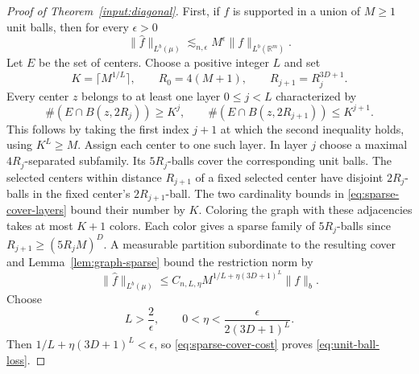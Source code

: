 \documentclass[11pt]{article}
\numberwithin{equation}{section}
\newcommand{\R}{\mathbb{R}}
\newcommand{\norm}[1]{\lVert #1\rVert}
\begin{document}
\begin{proof}[Proof of Theorem~\ref{input:diagonal}]
First, if \(f\) is supported in a union of \(M\ge1\) unit balls, then
for every \(\epsilon>0\)
\begin{equation}\label{eq:unit-ball-loss}
 \norm{\widehat f}_{L^b(\mu)}
 \lesssim_{n,\epsilon} M^\epsilon\norm f_{L^b(\R^m)}.
\end{equation}
Let \(E\) be the set of centers. Choose a positive integer \(L\) and set
\[
 K=\lceil M^{1/L}\rceil,\qquad
 R_0=4(M+1),\qquad R_{j+1}=R_j^{3D+1}.
\]
Every center \(z\) belongs to at least one layer \(0\le j<L\)
characterized by
\begin{equation}\label{eq:sparse-cover-layers}
 \#(E\cap B(z,2R_j))\ge K^j,\qquad
 \#(E\cap B(z,2R_{j+1}))\le K^{j+1}.
\end{equation}
This follows by taking the first index \(j+1\) at which the second
inequality holds, using \(K^L\ge M\). Assign each center to one
such layer. In layer \(j\) choose a maximal \(4R_j\)-separated
subfamily. Its \(5R_j\)-balls cover the corresponding unit balls.
The selected centers within distance \(R_{j+1}\) of a fixed
selected center have disjoint \(2R_j\)-balls in the fixed center's
\(2R_{j+1}\)-ball. The two cardinality bounds in \eqref{eq:sparse-cover-layers}
bound their number by \(K\). Coloring the graph with these adjacencies takes at most
\(K+1\) colors. Each color gives a sparse family of \(5R_j\)-balls
since \(R_{j+1}\ge(5R_jM)^D\). A measurable partition subordinate to
the resulting cover and Lemma~\ref{lem:graph-sparse} bound the
restriction norm by
\begin{equation}\label{eq:sparse-cover-cost}
 \norm{\widehat f}_{L^b(\mu)}
 \le C_{n,L,\eta} M^{1/L+\eta(3D+1)^L}\norm f_b.
\end{equation}
Choose
\[
 L>\frac2\epsilon,\qquad
 0<\eta<\frac{\epsilon}{2(3D+1)^L}.
\]
Then \(1/L+\eta(3D+1)^L<\epsilon\), so
\eqref{eq:sparse-cover-cost} proves \eqref{eq:unit-ball-loss}.


\end{proof}
\end{document}
